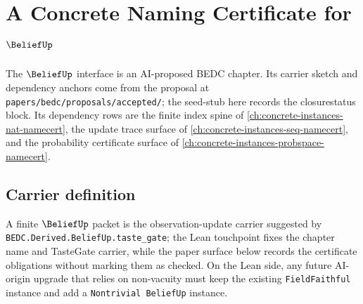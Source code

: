 \chapter{A Concrete Naming Certificate for $\BeliefUp$}
\label{ch:concrete-instances-belief-namecert}

The $\BeliefUp$ interface is an AI-proposed BEDC chapter. Its carrier
sketch and dependency anchors come from the proposal at
\texttt{papers/bedc/proposals/accepted/}; the seed-stub here records
the closurestatus block. Its dependency rows are the finite index spine of
\autoref{ch:concrete-instances-nat-namecert}, the update trace surface of
\autoref{ch:concrete-instances-seq-namecert}, and the probability certificate
surface of \autoref{ch:concrete-instances-probspace-namecert}.


\section{Carrier definition}
\label{sec:belief-carrier}

A finite $\BeliefUp$ packet is the observation-update carrier suggested by
\texttt{BEDC.Derived.BeliefUp.taste\_gate}; the Lean touchpoint fixes the
chapter name and TasteGate carrier, while the paper surface below records the
certificate obligations without marking them as checked. On the Lean side, any
future AI-origin upgrade that relies on non-vacuity must keep the existing
\texttt{FieldFaithful} instance and add a \texttt{Nontrivial BeliefUp}
instance.

